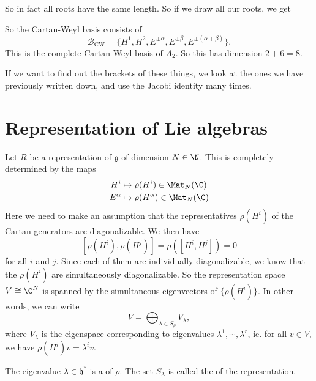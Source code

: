 \documentclass[a4paper]{article}
\begin{document}
\begin{eg}
  So in fact all roots have the same length. So if we draw all our roots, we get
  \begin{center}
  \end{center}
  So the Cartan-Weyl basis consists of 
  \[
    \mathcal{B}_{\mathrm{CW}} = \{H^1, H^2, E^{\pm \alpha}, E^{\pm \beta}, E^{\pm(\alpha + \beta)}\}.
  \]
  This is the complete Cartan-Weyl basis of $A_2$. So this has dimension $2 + 6 = 8$.

  If we want to find out the brackets of these things, we look at the ones we have previously written down, and use the Jacobi identity many times.
\end{eg}

\section{Representation of Lie algebras}
Let $R$ be a representation of $\mathfrak{g}$ of dimension $N \in \N$. This is completely determined by the maps
\begin{align*}
  H^i &\mapsto \rho(H^i) \in \Mat_N(\C)\\
  E^\alpha &\mapsto \rho(H^\alpha) \in \Mat_N(\C)
\end{align*}
Here we need to make an assumption that the representatives $\rho(H^i)$ of the Cartan generators are diagonalizable. We then have
\[
  [\rho(H^i), \rho(H^j)] = \rho([H^i, H^j]) = 0
\]
for all $i$ and $j$. Since each of them are individually diagonalizable, we know that the $\rho(H^i)$ are simultaneously diagonalizable. So the representation space $V \cong \C^N$ is spanned by the simultaneous eigenvectors of $\{\rho(H^i)\}$. In other words, we can write
\[
  V = \bigoplus_{\lambda \in S_\rho} V_\lambda,
\]
where $V_\lambda$ is the eigenspace corresponding to eigenvalues $\lambda^1, \cdots, \lambda^r$, ie. for all $v \in V$, we have $\rho(H^i)v = \lambda^i v$.

The eigenvalue $\lambda \in \mathfrak{h}^*$ is a  of $\rho$. The set $S_\lambda$ is called the  of the representation.
\end{document}
